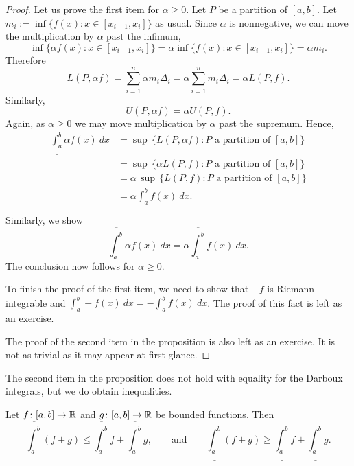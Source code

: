 \pagebreak[2]
\begin{proof}
Let us prove the first item for $\alpha \geq 0$. 
Let $P$ be a partition of $[a,b]$.
Let $m_i := \inf \{ f(x) : x \in [x_{i-1},x_i] \}$ as usual.
Since $\alpha$ is nonnegative, we can move the multiplication by $\alpha$
past the infimum,
\begin{equation*}
\inf \{ \alpha f(x) : x \in [x_{i-1},x_i] \}
=
\alpha \inf \{ f(x) : x \in [x_{i-1},x_i] \} = \alpha m_i .
\end{equation*}
Therefore
\begin{equation*}
L(P,\alpha f) =
\sum_{i=1}^n \alpha m_i \Delta_i = \alpha \sum_{i=1}^n m_i \Delta_i = \alpha
L(P,f).
\end{equation*}
Similarly,
\begin{equation*}
U(P,\alpha f) = \alpha U(P,f) .
\end{equation*}
Again, as $\alpha \geq 0$ we
may move multiplication by $\alpha$ past the supremum.  Hence,
\begin{equation*}
\begin{split}
\underline{\int_a^b} \alpha f(x)~dx & =
\sup \, \bigl\{ L(P,\alpha f) : \text{$P$ a partition of $[a,b]$} \bigr\}
\\
& =
\sup \, \bigl\{ \alpha L(P,f) : \text{$P$ a partition of $[a,b]$} \bigr\}
\\
& =
\alpha \,
\sup \, \bigl\{ L(P,f) : \text{$P$ a partition of $[a,b]$} \bigr\}
\\
& =
\alpha
\underline{\int_a^b} f(x)~dx .
\end{split}
\end{equation*}
Similarly, we show 
\begin{equation*}
\overline{\int_a^b} \alpha f(x)~dx
=
\alpha
\overline{\int_a^b} f(x)~dx .
\end{equation*}
The conclusion now follows for $\alpha \geq 0$.

To finish the proof of the first item, we need to show 
that $-f$ is Riemann integrable and
$\int_a^b - f(x)~dx =
-
\int_a^b f(x)~dx$.  The proof of this fact is left as an exercise.

The proof of the second item in the proposition is also left as an exercise.
It is not as
trivial as it may appear at first glance.
\end{proof}

The second item in the proposition does not hold with
equality for the Darboux integrals, but we do obtain inequalities.

\begin{prop} \label{prop:upperlowerlinineq}
Let $f \colon [a,b] \to {\mathbb{R}}$ and $g \colon [a,b] \to {\mathbb{R}}$ be bounded
functions.  Then
\begin{equation*}
\overline{\int_a^b} (f+g) \leq \overline{\int_a^b}f+\overline{\int_a^b}g
,
\qquad
\text{and}
\qquad
\underline{\int_a^b} (f+g) \geq \underline{\int_a^b}f+\underline{\int_a^b}g
.
\end{equation*}
\end{prop}

